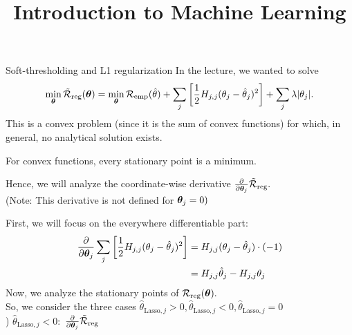 \documentclass[11pt,compress,t,notes=noshow, xcolor=table]{beamer}
\title{Introduction to Machine Learning}
\date{}
\begin{document}



\begin{vbframe}{Soft-thresholding and L1 regularization}
In the lecture, we wanted to solve
     \[
      \min_{\bm{\theta}} \mathcal{\tilde R}_{\text{reg}}(\bm{\theta}) =  \min_{\bm{\theta}}\mathcal{R}_{\text{emp}}(\hat{\theta}) + \sum_j \left[ \frac{1}{2} H_{j,j} (\theta_j - \hat{\theta}_j)^2 \right] + \sum_j \lambda |\theta_j|.
      \] 
This is a convex problem (since it is the sum of convex functions) for which, in general, no analytical solution exists. \\
\lz

For convex functions, every stationary point is a minimum. \\
\lz

 Hence, we will analyze the coordinate-wise derivative $\frac{\partial}{\partial \bm{\theta}_j} \mathcal{\tilde R}_{\text{reg}}.$ \\
 (Note: This derivative is not defined for $\bm{\theta}_j = 0)$\\

\framebreak

First, we will focus on the everywhere differentiable part:
\begin{align*}
\frac{\partial}{\partial \bm{\theta}_j}\sum_j \left[\frac{1}{2}  H_{j,j} (\theta_j - \hat{\theta}_j)^2 \right]
    &=  H_{j,j} (\theta_j - \hat{\theta}_j)\cdot(-1)  \\
        &=H_{j,j} \hat{\theta}_j - H_{j,j}\theta_j  \\
\end{align*}
Now, we analyze the stationary points of $\mathcal{R}_{\text{reg}}(\bm{\theta}).$ \\
So, we consider the three cases $\hat{\theta}_{\text{Lasso},j} > 0, \hat{\theta}_{\text{Lasso},j} < 0, \hat{\theta}_{\text{Lasso},j} = 0$ \\
) $\hat{\theta}_{\text{Lasso},j} < 0:$
$\frac{\partial}{\partial \bm{\theta}_j}\mathcal{\tilde R}_{\text{reg}}$ 
\framebreak




\end{vbframe}

\endlecture
\end{document}
